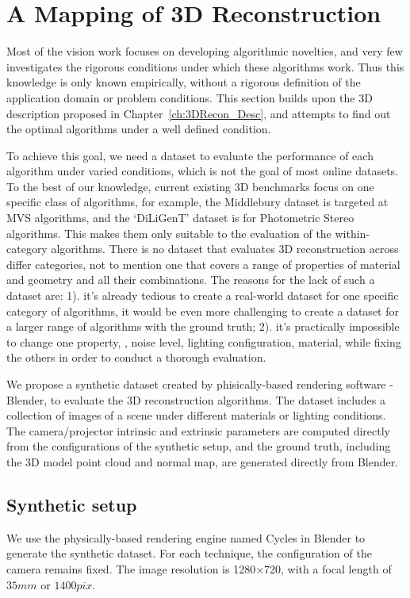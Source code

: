 
\chapter{A Mapping of 3D Reconstruction}
\label{ch:3DRecon_Mapping}
Most of the vision work focuses on developing algorithmic novelties, and very few investigates the rigorous conditions under which these algorithms work. Thus this knowledge is only known empirically, without a rigorous definition of the application domain or problem conditions. This section builds upon the 3D description proposed in Chapter~\ref{ch:3DRecon_Desc}, and attempts to find out the optimal algorithms under a well defined condition.

To achieve this goal, we need a dataset to evaluate the performance of each algorithm under varied conditions, which is not the goal of most online datasets. To the best of our knowledge, current existing 3D benchmarks focus on one specific class of algorithms, for example, the Middlebury dataset is targeted at MVS algorithms, and the `DiLiGenT' dataset is for Photometric Stereo algorithms. This makes them only suitable to the evaluation of the within-category algorithms. There is no dataset that evaluates 3D reconstruction across differ categories, not to mention one that covers a range of properties of material and geometry and all their combinations. The reasons for the lack of such a dataset are: 1). it's already tedious to create a real-world dataset for one specific category of algorithms, it would be even more challenging to create a dataset for a larger range of algorithms with the ground truth; 2). it's practically impossible to change one property, \eg, noise level, lighting configuration, material, \etc while fixing the others in order to conduct a thorough evaluation.

We propose a synthetic dataset created by phisically-based rendering software - Blender, to evaluate the 3D reconstruction algorithms. The dataset includes a collection of images of a scene under different materials or lighting conditions. The camera/projector intrinsic and extrinsic parameters are computed directly from the configurations of the synthetic setup, and the ground truth, including the 3D model point cloud and normal map, are generated directly from Blender.

\section{Synthetic setup}
We use the physically-based rendering engine named Cycles in Blender to generate the synthetic dataset. For each technique, the configuration of the camera remains fixed. The image resolution is 1280$\times$720, with a focal length of $35mm$ or $1400pix$.


